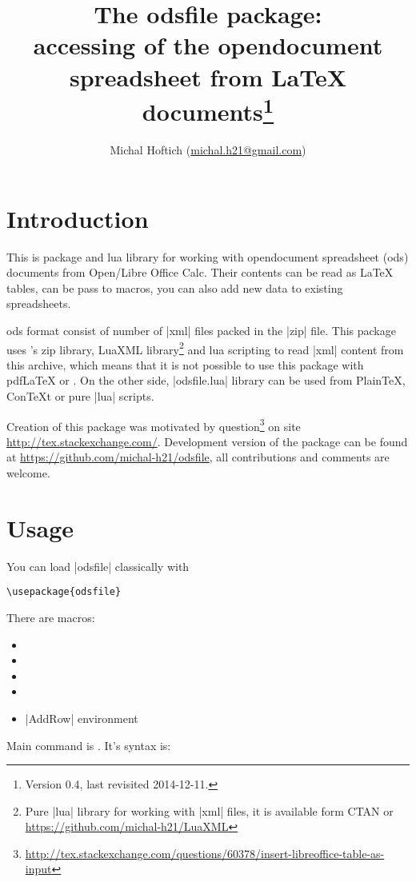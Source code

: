 \documentclass{ltxdoc}
\author{Michal Hoftich (\url{michal.h21@gmail.com})}
\title{The \textsf{odsfile} package:\\
accessing of the \textsf{opendocument spreadsheet} from \LaTeX{}
documents\thanks{Version 0.4, last revisited 2014-12-11.}
}
\newcommand\ods{\textsf{ods}\xspace}
\begin{document}
\maketitle

\tableofcontents

\section{Introduction}

This is \LuaLaTeX{} package and \textsf{lua} library for working with 
\textsf{opendocument spreadsheet} (\ods) documents from Open/Libre Office Calc. 
Their contents can be read as \LaTeX{} tables, can be pass to macros,
 you can also add new data to existing spreadsheets.

\ods format consist of number of |xml| files packed in the |zip| file. 
This package uses \LuaTeX's zip library, LuaXML library\footnote{Pure |lua| library 
for working with |xml| files, it is available form CTAN or \url{https://github.com/michal-h21/LuaXML}} and lua scripting to read |xml| content from this archive, 
which means that it is not possible to use this package with pdf\LaTeX{} or \XeLaTeX. 
On the other side, |odsfile.lua| library can be used from Plain\TeX, 
Con\TeX{}t or pure |lua| scripts.   

Creation of this package was motivated by question\footnote{\url{http://tex.stackexchange.com/questions/60378/insert-libreoffice-table-as-input}} on site \url{http://tex.stackexchange.com/}. Development version of the package can be found at \url{https://github.com/michal-h21/odsfile}, all contributions and comments are welcome. 
\section{Usage}

You can load |odsfile| classically with
\begin{verbatim}
\usepackage{odsfile}
\end{verbatim}
There are macros:
\begin{itemize}
\item {}
\item \cmd{\tabletemplate}
\item \cmd{\loadodsfile}
\item \cmd{\savespreadsheet}
\item |AddRow| environment 
\end{itemize}

\noindent Main command is . It's syntax is:\\ 
\end{document}
